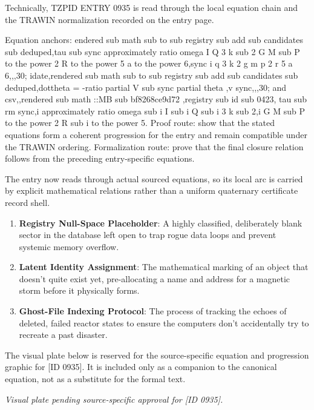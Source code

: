 Technically, TZPID ENTRY 0935 is read through the local equation chain and the TRAWIN normalization recorded on the entry page.

Equation anchors: endered sub math sub to sub registry sub add sub candidates sub deduped,tau sub sync approximately ratio omega I Q 3 k sub 2 G M sub P to the power 2 R to the power 5 a to the power 6,sync i q 3 k 2 g m p 2 r 5 a 6,,,30; idate,rendered sub math sub to sub registry sub add sub candidates sub deduped,dottheta = -ratio partial V sub sync partial theta ,v sync,,,30; and csv,,rendered sub math ::MB sub bf8268ce9d72 ,registry sub id sub 0423, tau sub rm sync,i approximately ratio omega sub i I sub i Q sub i 3 k sub 2,i G M sub P to the power 2 R sub i to the power 5. Proof route: show that the stated equations form a coherent progression for the entry and remain compatible under the TRAWIN ordering. Formalization route: prove that the final closure relation follows from the preceding entry-specific equations.

The entry now reads through actual sourced equations, so its local arc is carried by explicit mathematical relations rather than a uniform quaternary certificate record shell.
\endgroup

\begin{enumerate}[leftmargin=1.6em,itemsep=6pt,topsep=4pt]
\item \textbf{Registry Null-Space Placeholder}: A highly classified, deliberately blank sector in the database left open to trap rogue data loops and prevent systemic memory overflow.
\item \textbf{Latent Identity Assignment}: The mathematical marking of an object that doesn't quite exist yet, pre-allocating a name and address for a magnetic storm before it physically forms.
\item \textbf{Ghost-File Indexing Protocol}: The process of tracking the echoes of deleted, failed reactor states to ensure the computers don't accidentally try to recreate a past disaster.
\end{enumerate}

\begingroup\footnotesize\sloppy
The visual plate below is reserved for the source-specific equation and progression graphic for [ID 0935]. It is included only as a companion to the canonical equation, not as a substitute for the formal text.
\par\endgroup
\begingroup\footnotesize\itshape
Visual plate pending source-specific approval for [ID 0935].
\par\endgroup

